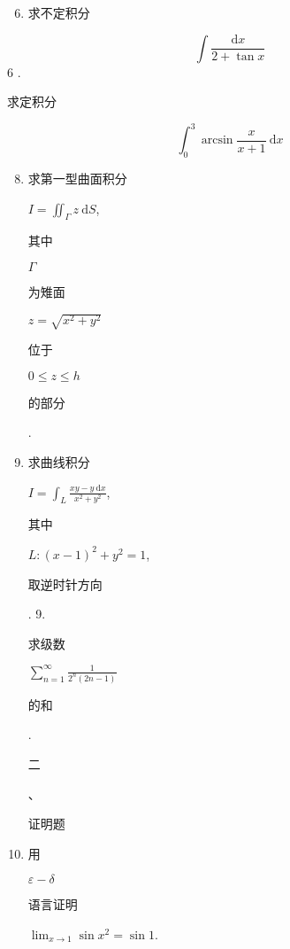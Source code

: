 \documentclass[10pt]{article}
\begin{document}
\begin{enumerate}
  \setcounter{enumi}{5}
  \item \begin{CJK}{UTF8}{mj}求不定积分\end{CJK}
\end{enumerate}
$$
\int \frac{\mathrm{d} x}{2+\tan x}
$$
6 . \begin{CJK}{UTF8}{mj}求定积分\end{CJK}
$$
\int_{0}^{3} \arcsin \frac{x}{x+1} \mathrm{~d} x
$$

\begin{enumerate}
  \setcounter{enumi}{7}
  \item \begin{CJK}{UTF8}{mj}求第一型曲面积分\end{CJK} $I=\iint_{\Gamma} z \mathrm{~d} S$, \begin{CJK}{UTF8}{mj}其中\end{CJK} $\Gamma$ \begin{CJK}{UTF8}{mj}为雉面\end{CJK} $z=\sqrt{x^{2}+y^{2}}$ \begin{CJK}{UTF8}{mj}位于\end{CJK} $0 \leq z \leq h$ \begin{CJK}{UTF8}{mj}的部分\end{CJK}.

  \item \begin{CJK}{UTF8}{mj}求曲线积分\end{CJK} $I=\int_{L} \frac{x y-y \mathrm{~d} x}{x^{2}+y^{2}}$, \begin{CJK}{UTF8}{mj}其中\end{CJK} $L:(x-1)^{2}+y^{2}=1$, \begin{CJK}{UTF8}{mj}取逆时针方向\end{CJK}. 9. \begin{CJK}{UTF8}{mj}求级数\end{CJK} $\sum_{n=1}^{\infty} \frac{1}{2^{n}(2 n-1)}$ \begin{CJK}{UTF8}{mj}的和\end{CJK}. \begin{CJK}{UTF8}{mj}二\end{CJK}、 \begin{CJK}{UTF8}{mj}证明题\end{CJK}

  \item \begin{CJK}{UTF8}{mj}用\end{CJK} $\varepsilon-\delta$ \begin{CJK}{UTF8}{mj}语言证明\end{CJK} $\lim _{x \rightarrow 1} \sin x^{2}=\sin 1$.


\end{enumerate}
\end{document}
